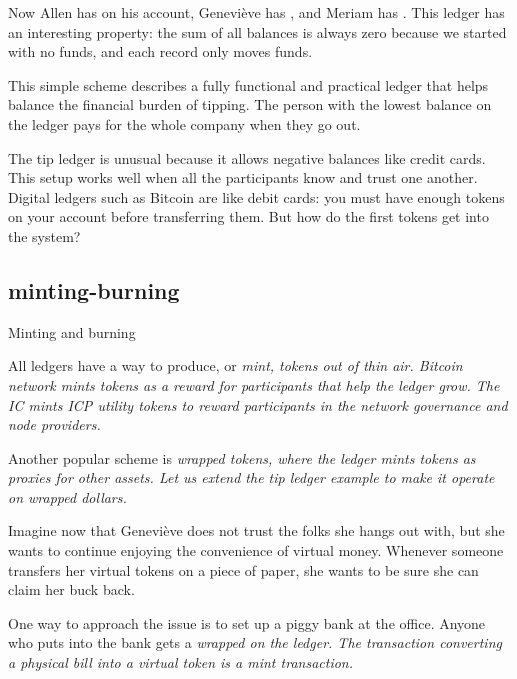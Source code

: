 \documentclass{article}
\begin{document}
Now Allen has  on his account, Geneviève has , and Meriam has .
This ledger has an interesting property: the sum of all balances is always zero because we started with no funds, and each record only moves funds.

This simple scheme describes a fully functional and practical ledger that helps balance the financial burden of tipping.
The person with the lowest balance on the ledger pays for the whole company when they go out.

The tip ledger is unusual because it allows negative balances like credit cards.
This setup works well when all the participants know and trust one another.
Digital ledgers such as Bitcoin are like debit cards: you must have enough tokens on your account before transferring them.
But how do the first tokens get into the system?

\subsection{minting-burning}{Minting and burning}

All ledgers have a way to produce, or \em{mint}, tokens out of thin air.
Bitcoin network mints tokens as a reward for participants that help the ledger grow.
The IC mints ICP utility tokens to reward participants in the network governance and node providers.

Another popular scheme is \em{wrapped tokens}, where the ledger mints tokens as proxies for other assets.
Let us extend the tip ledger example to make it operate on wrapped dollars.

Imagine now that Geneviève does not trust the folks she hangs out with, but she wants to continue enjoying the convenience of virtual money.
Whenever someone transfers her virtual tokens on a piece of paper, she wants to be sure she can claim her buck back.

One way to approach the issue is to set up a piggy bank at the office.
Anyone who puts  into the bank gets a \em{wrapped}  on the ledger.
The transaction converting a physical bill into a virtual token is a \em{mint} transaction.
\end{document}
